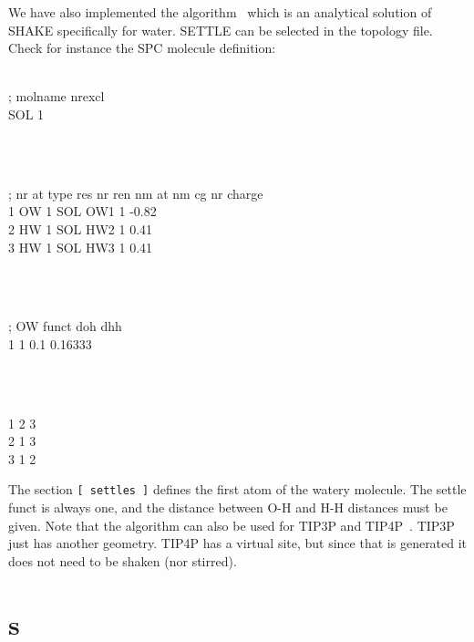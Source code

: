 We have also implemented the  algorithm~\cite{Miyamoto92}
which is an analytical solution of SHAKE specifically for water. 
SETTLE can be selected in the topology file. Check for instance the
SPC molecule definition:\\
\begin{tt}
[ moleculetype ]\\
; molname       nrexcl\\
SOL             1\\
\end{tt}\\
\begin{tt}
[ atoms ]\\
; nr    at type res nr  ren nm  at nm   cg nr   charge\\
1       OW      1       SOL     OW1     1       -0.82\\
2       HW      1       SOL     HW2     1        0.41\\
3       HW      1       SOL     HW3     1        0.41\\
\end{tt}\\
\begin{tt}
[ settles ]\\
; OW    funct   doh     dhh\\
1       1       0.1     0.16333\\
\end{tt}\\
\begin{tt}
[ exclusions ]\\
1       2       3\\
2       1       3\\
3       1       2\\
\end{tt}
The section {\tt [ settles ]} defines the first atom of the watery molecule.
The settle funct is always one, and the distance between O-H and H-H distances
must be given. Note that the algorithm can also be used
for TIP3P and TIP4P~\cite{Jorgensen83}.
TIP3P just has another geometry. TIP4P has a virtual site, but since 
that is generated it does not need to be shaken (nor stirred).

\section{s}

